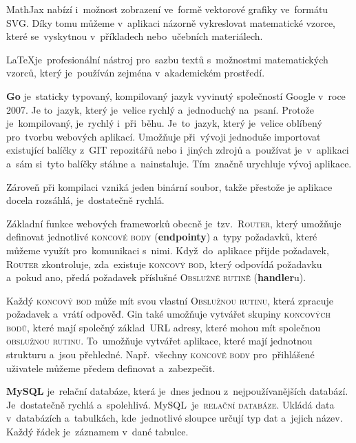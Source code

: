\documentclass[14pt,a4paper]{article}
\begin{document}
            MathJax nabízí i~možnost zobrazení ve~formě vektorové grafiky ve~formátu SVG.
            Díky tomu můžeme v~aplikaci názorně vykreslovat matematické vzorce, které se~vyskytnou v~příkladech nebo~učebních materiálech.\parencite{abclinuxuMatematickxE9Vzorce}

            \LaTeX je~profesionální nástroj pro~sazbu textů s~možnostmi matematických vzorců, který je~používán zejména v~akademickém prostředí.\parencite{Rybicka2003:latex}

            \textbf{Go} je~staticky typovaný, kompilovaný jazyk vyvinutý společností Google v~roce 2007. Je to~jazyk, který je~velice rychlý a~jednoduchý na~psaní.
            Protože je~kompilovaný, je~rychlý i~při~běhu. Je~to~jazyk, který je~velice oblíbený pro~tvorbu webových aplikací.
            Umožňuje při~vývoji jednoduše importovat existující balíčky z~GIT repozitářů nebo i~jiných zdrojů a~používat je~v~aplikaci a~sám
            si~tyto balíčky stáhne a~nainstaluje. Tím~značně urychluje vývoj aplikace.

            Zároveň při kompilaci vzniká jeden binární soubor, takže přestože je aplikace docela rozsáhlá, je~dostatečně rychlá.

            Základní funkce webových frameworků obecně je~tzv.~\textsc{Router}, který umožňuje definovat jednotlivé \textsc{koncové body} (\textbf{endpointy}) a~typy požadavků, které můžeme využít pro~komunikaci s~nimi.
            Když~do~aplikace přijde požadavek, \textsc{Router} zkontroluje, zda~existuje \textsc{koncový bod}, který odpovídá požadavku a~pokud ano, předá požadavek příslušné \textsc{Obslužné rutině} (\textbf{handler}u).

            Každý \textsc{koncový bod} může mít svou vlastní \textsc{Obslužnou rutinu}, která zpracuje požadavek a~vrátí odpověď.
            Gin také umožňuje vytvářet skupiny \textsc{koncových bodů}, které mají společný základ~URL adresy, které mohou mít společnou \textsc{obslužnou rutinu}.
            To~umožňuje vytvářet aplikace, které mají jednotnou strukturu a~jsou přehledné. Např.~všechny \textsc{koncové body} pro~přihlášené
            uživatele můžeme předem definovat a~zabezpečit.
            
            \textbf{MySQL} je~relační databáze, která je~dnes jednou z~nejpoužívanějších databází. Je~dostatečně rychlá a~spolehlivá. \parencite{databases21}
            MySQL~je~\textsc{relační databáze}. Ukládá data v~databázích a~tabulkách, kde~jednotlivé sloupce určují typ dat a~jejich název. Každý řádek je~záznamem v~dané tabulce.
            
\end{document}
